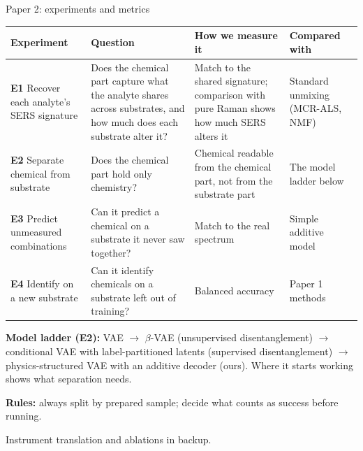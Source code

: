 \documentclass[aspectratio=169,10pt]{beamer}
\newcommand{\src}[1]{{\par\vspace{1pt}\tiny\color{cInk2}#1\par}}
\begin{document}
\begin{frame}{Paper 2: experiments and metrics}
\footnotesize
\renewcommand{\arraystretch}{1.25}
\begin{tabular}{@{}>{\raggedright\arraybackslash}p{}>{\raggedright\arraybackslash}p{}>{\raggedright\arraybackslash}p{}>{\raggedright\arraybackslash}p{}@{}}
\toprule
Experiment & Question & How we measure it & Compared with\\
\midrule
\textbf{E1} Recover each analyte's SERS signature & Does the chemical part capture what the analyte shares across substrates, and how much does each substrate alter it? & Match to the shared signature; comparison with pure Raman shows how much SERS alters it & Standard unmixing (MCR-ALS, NMF)\\
\textbf{E2} Separate chemical from substrate & Does the chemical part hold only chemistry? & Chemical readable from the chemical part, not from the substrate part & The model ladder below\\
\textbf{E3} Predict unmeasured combinations & Can it predict a chemical on a substrate it never saw together? & Match to the real spectrum & Simple additive model\\
\textbf{E4} Identify on a new substrate & Can it identify chemicals on a substrate left out of training? & Balanced accuracy & Paper 1 methods\\
\bottomrule
\end{tabular}

\medskip
\small
\textbf{Model ladder (E2):} VAE $\to$ $\beta$-VAE (unsupervised disentanglement) $\to$ conditional VAE with label-partitioned latents (supervised disentanglement) $\to$ physics-structured VAE with an additive decoder (ours). Where it starts working shows what separation needs.

\smallskip
\textbf{Rules:} always split by prepared sample; decide what counts as success before running.
\src{Instrument translation and ablations in backup.}
\end{frame}
\end{document}
